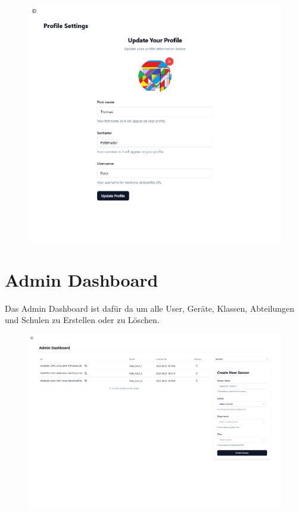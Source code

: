 \begin{inhalt}
\begin{enumerate}[label=\textbf{\arabic*.}]
\begin{figure}[!htb]
\centering
\includegraphics[width=1\textwidth]{files/Thomas/pics/Website/Profile/profile-screen.png}
\caption[Bildbezeichnung für Abbildungsverzeichnis]{}
\label{fig:gehaeuse_internet_bild}
\end{figure}

\newpage

\section{Admin Dashboard}

Das Admin Dashboard ist dafür da um alle User, Geräte, Klassen, Abteilungen und Schulen zu Erstellen oder zu Löschen. 

\begin{figure}[!htb]
\centering
\includegraphics[width=1\textwidth]{files/Thomas/pics/Website/admin/devices/devices-screen.png}
\caption[Bildbezeichnung für Abbildungsverzeichnis]{}
\label{fig:gehaeuse_internet_bild}
\end{figure}


\end{enumerate}
\end{inhalt}
